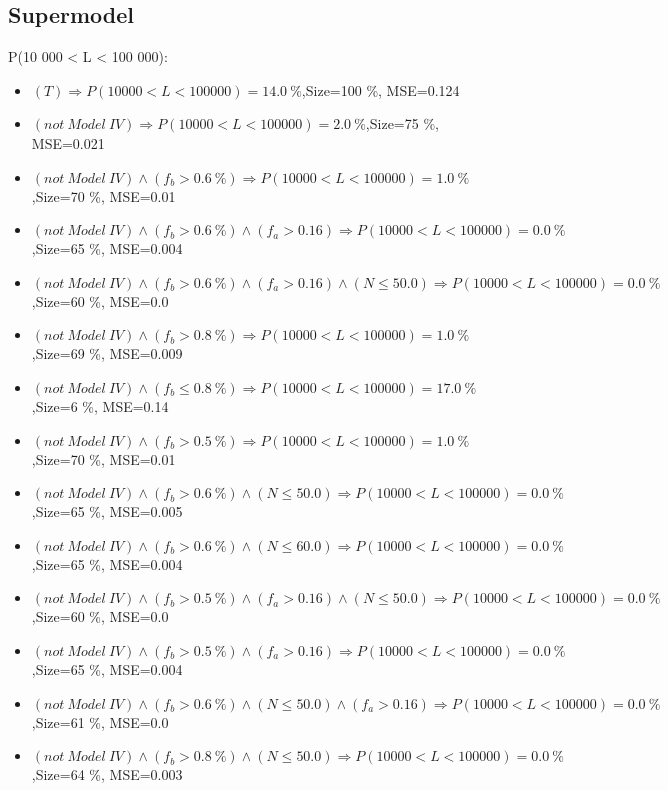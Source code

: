 \documentclass[numbered]{CSL}
\begin{document}
\subsection{Supermodel}
P(10 000 < L < 100 000):
\begin{itemize}
\item $(T) \Rightarrow P(10 000 < L < 100 000) = 14.0~\%$,\hfill Size=100 \%, MSE=0.124
\item $(not~Model~IV) \Rightarrow P(10 000 < L < 100 000) = 2.0~\%$,\hfill Size=75 \%, MSE=0.021
\item $(not~Model~IV) \land (f_b > 0.6~\%) \Rightarrow P(10 000 < L < 100 000) = 1.0~\%$,\hfill Size=70 \%, MSE=0.01
\item $(not~Model~IV) \land (f_b > 0.6~\%) \land (f_a > 0.16) \Rightarrow P(10 000 < L < 100 000) = 0.0~\%$,\hfill Size=65 \%, MSE=0.004
\item $(not~Model~IV) \land (f_b > 0.6~\%) \land (f_a > 0.16) \land (N \leq 50.0) \Rightarrow P(10 000 < L < 100 000) = 0.0~\%$,\hfill Size=60 \%, MSE=0.0
\item $(not~Model~IV) \land (f_b > 0.8~\%) \Rightarrow P(10 000 < L < 100 000) = 1.0~\%$,\hfill Size=69 \%, MSE=0.009
\item $(not~Model~IV) \land (f_b \leq 0.8~\%) \Rightarrow P(10 000 < L < 100 000) = 17.0~\%$,\hfill Size=6 \%, MSE=0.14
\item $(not~Model~IV) \land (f_b > 0.5~\%) \Rightarrow P(10 000 < L < 100 000) = 1.0~\%$,\hfill Size=70 \%, MSE=0.01
\item $(not~Model~IV) \land (f_b > 0.6~\%) \land (N \leq 50.0) \Rightarrow P(10 000 < L < 100 000) = 0.0~\%$,\hfill Size=65 \%, MSE=0.005
\item $(not~Model~IV) \land (f_b > 0.6~\%) \land (N \leq 60.0) \Rightarrow P(10 000 < L < 100 000) = 0.0~\%$,\hfill Size=65 \%, MSE=0.004
\item $(not~Model~IV) \land (f_b > 0.5~\%) \land (f_a > 0.16) \land (N \leq 50.0) \Rightarrow P(10 000 < L < 100 000) = 0.0~\%$,\hfill Size=60 \%, MSE=0.0
\item $(not~Model~IV) \land (f_b > 0.5~\%) \land (f_a > 0.16) \Rightarrow P(10 000 < L < 100 000) = 0.0~\%$,\hfill Size=65 \%, MSE=0.004
\item $(not~Model~IV) \land (f_b > 0.6~\%) \land (N \leq 50.0) \land (f_a > 0.16) \Rightarrow P(10 000 < L < 100 000) = 0.0~\%$,\hfill Size=61 \%, MSE=0.0
\item $(not~Model~IV) \land (f_b > 0.8~\%) \land (N \leq 50.0) \Rightarrow P(10 000 < L < 100 000) = 0.0~\%$,\hfill Size=64 \%, MSE=0.003

\end{itemize}
\end{document}
